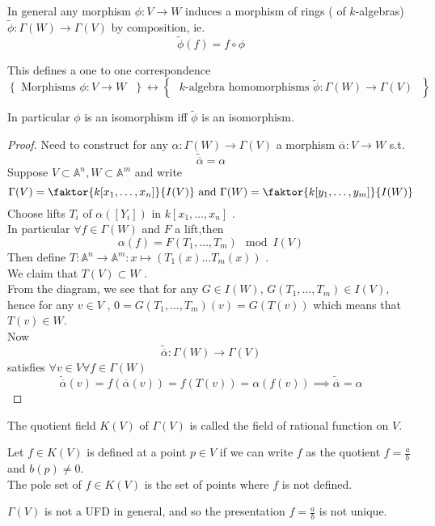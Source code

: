 \documentclass[../main.tex]{subfiles}
\begin{document}
In general any morphism $\phi: V\to W$ induces a morphism of rings ( of $k$-algebras) $\tilde\phi:\Gamma( W) \to\Gamma( V) $ by composition, ie.
\[ 
\tilde\phi( f) =f\circ\phi
\]
\begin{propo}
This defines a one to one correspondence 
\[ 
\left\{ \text{ Morphisms $\phi:V\to W$  }  \right\} \leftrightarrow \left\{ \text{ $k$-algebra homomorphisms $\tilde\phi:\Gamma( W) \to \Gamma( V) $  }  \right\}
\]

\end{propo}
In particular $\phi$ is an isomorphism iff $\tilde\phi$ is an isomorphism.
\begin{proof}
Need to construct for any $\alpha:\Gamma( W) \to \Gamma( V) $ a morphism $ \overline\alpha:V\to W$ s.t.
\[ 
	\tilde{\overline{\alpha}} = \alpha
\]
Suppose $V \subset \mathbb{A}^{n}, W \subset \mathbb{A}^{m}$ and write
\[ 
	\Gamma( V) = \faktor { k[x_1,\ldots,x_n]} { I( V) } \text{ and } \Gamma( W) = \faktor { k[y_1,\ldots,y_m]} { I( W) }
\]
Choose lifts $T_i$ of $\alpha( [ Y_i] ) $ in $k[x_1,\ldots,x_n]$ .\\
In particular $\forall f \in\Gamma( W) $ and $F$ a lift,then
\[ 
\alpha( f) =F( T_1,\ldots,T_m) \mod I( V) 
\]
Then define $ T:\mathbb{A}^{n}\to \mathbb{A}^{m}:x\mapsto ( T_1( x) \ldots T_m( x) ) $ .\\
We claim that $T( V) \subset W$ .\\
From the diagram, we see that for any $G\in I( W) $, $G( T_1,\ldots,T_m) \in I( V) $, hence for any $v\in V$ , $0= G( T_1,\ldots,T_m) ( v) = G( T( v) ) $ which means that $T( v) \in W$.\\
Now 
\[ 
	\tilde{\overline{\alpha}} :\Gamma( W) \to\Gamma( V) 
\]
satisfies $\forall v \in V\forall f \in\Gamma( W) $ 
\[ 
	\tilde{\overline{\alpha}}( v) =f( \overline{\alpha}( v) ) = f( T( v) ) = \alpha( f( v) ) \implies \tilde{\overline{\alpha}} = \alpha
\]

\end{proof}
\begin{defn}
	The quotient field $K( V) $ of $\Gamma( V) $ is called the field of rational function on $V$.
\end{defn}
Let $f\in K( V) $ is defined at a point $p\in V$ if we can write $f$ as the quotient $f= \frac{a}{b}$ and $b( p) \neq 0$.\\
The pole set of $f\in K( V) $ is the set of points where $f$ is not defined.
\begin{rmq}
$\Gamma( V) $ is not a UFD in general, and so the presentation $ f= \frac{a}{b}$ is not unique.
\end{rmq}
\end{document}
